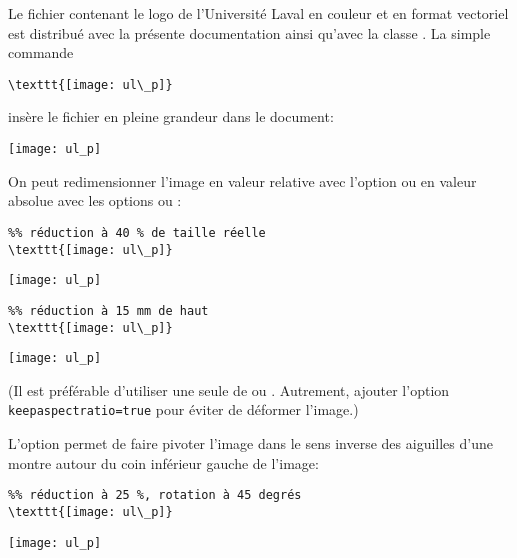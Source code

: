 \begin{exemple}
  Le fichier  contenant le logo de l'Université
  Laval en couleur et en format vectoriel est distribué avec la
  présente documentation ainsi qu'avec la classe . La
  simple commande
\begin{lstlisting}
\texttt{[image: ul\_p]}
\end{lstlisting}
  insère le fichier en pleine grandeur dans le document:
  \begin{demo}
    \texttt{[image: ul\_p]}
  \end{demo}

  On peut redimensionner l'image en valeur relative avec l'option
   ou en valeur absolue avec les options  ou
  :
  \begin{demo}
    \begin{texample}[0.62\linewidth]
\begin{lstlisting}
%% réduction à 40 % de taille réelle
\texttt{[image: ul\_p]}
\end{lstlisting}
      \producing
      \texttt{[image: ul\_p]}
    \end{texample}
    \medskip

    \begin{texample}[0.62\linewidth]
\begin{lstlisting}
%% réduction à 15 mm de haut
\texttt{[image: ul\_p]}
\end{lstlisting}
      \producing
      \texttt{[image: ul\_p]}
    \end{texample}
  \end{demo}
  (Il est préférable d'utiliser une seule de  ou
  . Autrement, ajouter l'option
  \lstinline|keepaspectratio=true| pour éviter de déformer l'image.)

  L'option  permet de faire pivoter l'image dans le sens
  inverse des aiguilles d'une montre autour du coin inférieur gauche
  de l'image:
  \begin{demo}
    \begin{texample}[0.72\linewidth]
\begin{lstlisting}
%% réduction à 25 %, rotation à 45 degrés
\texttt{[image: ul\_p]}
\end{lstlisting}
      \producing
      \texttt{[image: ul\_p]}
    \end{texample}
  \end{demo}


\end{exemple}
